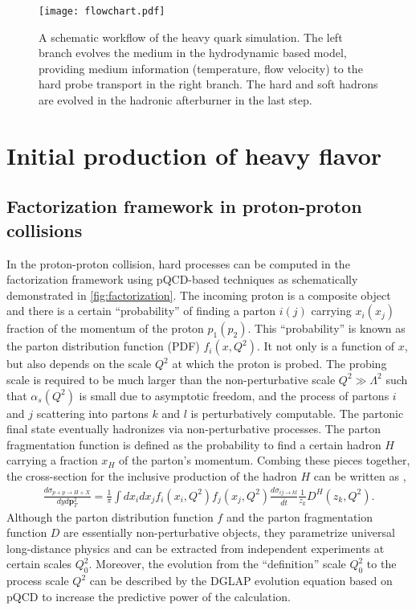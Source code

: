 \begin{figure}
\singlespacing
\centering
\texttt{[image: flowchart.pdf]}
\caption[A schematic workflow of the heavy quark simulation. The left]{A schematic workflow of the heavy quark simulation. The left branch evolves the medium in the hydrodynamic based model, providing medium information (temperature, flow velocity) to the hard probe transport in the right branch. The hard and soft hadrons are evolved in the hadronic afterburner in the last step.}
\label{fig:flowchart}
\end{figure}

\section{Initial production of heavy flavor}
\label{section:hard}
\subsection{Factorization framework in proton-proton collisions}
In the proton-proton collision, hard processes can be computed in the factorization framework using pQCD-based techniques as schematically demonstrated in \ref{fig:factorization}.
The incoming proton is a composite object and there is a certain ``probability'' of finding a parton $i(j)$ carrying $x_i(x_j)$ fraction of the momentum of the proton $p_1(p_2)$.
This ``probability'' is known as the parton distribution function (PDF) $f_i(x, Q^2)$.
It not only is a function of $x$, but also depends on the scale $Q^2$ at which the proton is probed.
The probing scale is required to be much larger than the non-perturbative scale $Q^2 \gg \Lambda^2$ such that $\alpha_s(Q^2)$ is small due to asymptotic freedom, and the process of partons $i$ and $j$ scattering into partons $k$ and $l$ is perturbatively computable.
The partonic final state eventually hadronizes via non-perturbative processes.
The parton fragmentation function is defined as the probability to find a certain hadron $H$ carrying a fraction $x_H$ of the parton's momentum.
Combing these pieces together, the cross-section for the inclusive production of the hadron $H$ can be written as \cite{Field:1989uq},
\begin{eqnarray}
\frac{d\sigma_{p+p\rightarrow H+X}}{dy d\mathbf{p}_T^2} = \frac{1}{\pi}\int dx_i dx_j f_i(x_i, Q^2) f_j(x_j, Q^2) \frac{d\sigma_{ij\rightarrow kl}}{d\hat{t}} \frac{1}{z_k}D^H(z_k, Q^2).
\end{eqnarray}
Although the parton distribution function $f$ and the parton fragmentation function $D$ are essentially non-perturbative objects, they parametrize universal long-distance physics and can be extracted from independent experiments at certain scales $Q_0^2$.
Moreover, the evolution from the ``definition'' scale $Q_0^2$ to the process scale $Q^2$ can be described by the DGLAP evolution equation \cite{Gribov:1972ri,Altarelli:1977zs,Dokshitzer:1977sg} based on pQCD to increase the predictive power of the calculation.

